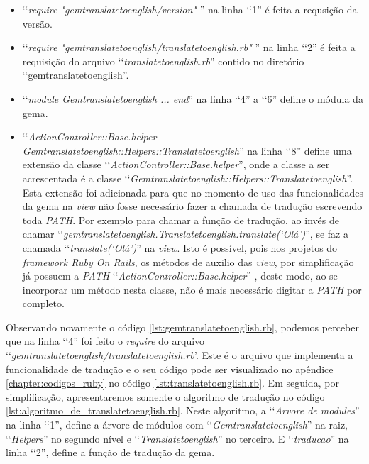 \begin{itemize}

 \item ‘‘\emph{require "gemtranslatetoenglish/version"} '' na linha ‘‘1'' é feita a requsição da versão.

 \item ‘‘\emph{require "gemtranslatetoenglish/translatetoenglish.rb"} '' na linha ‘‘2'' é feita a requisição
 do arquivo ‘‘\emph{translatetoenglish.rb}'' contido no diretório ‘‘gemtranslatetoenglish''.

 \item ‘‘\emph{module Gemtranslatetoenglish ... end}'' na linha ‘‘4'' a ‘‘6'' define o módula da gema.

 \item ‘‘\emph{ActionController::Base.helper Gemtranslatetoenglish::Helpers::Translatetoenglish}'' na linha
 ‘‘8'' define uma extensão da classe ‘‘\emph{ActionController::Base.helper}'', onde a classe a ser
 acrescentada é a classe ‘‘\emph{Gemtranslatetoenglish::Helpers::Translatetoenglish}''. Esta extensão foi
 adicionada para que no momento de uso das funcionalidades da gema na \emph{view} não fosse necessário
 fazer a chamada de tradução  escrevendo toda \emph{PATH}. Por exemplo para chamar a função de tradução,
 ao invés de chamar ‘‘\emph{gemtranslatetoenglish.Translatetoenglish.translate(‘Olá’)}'', se faz a chamada
 ‘‘\emph{translate(‘Olá’)}'' na \emph{view}. Isto é possível, pois nos projetos do
 \emph{framework Ruby On Rails}, os métodos de auxilio das \emph{view}, por simplificação já possuem a
 \emph{PATH} ‘‘\emph{ActionController::Base.helper}'' , deste modo, ao se incorporar um método nesta classe,
 não é mais necessário digitar a \emph{PATH} por completo.

\end{itemize}

Observando novamente o código \ref{lst:gemtranslatetoenglish.rb}, podemos perceber que na linha ‘‘4''
foi feito o \emph{require} do arquivo ‘‘\emph{gemtranslatetoenglish/translatetoenglish.rb}'. Este é o
arquivo que implementa a funcionalidade de tradução e o seu código pode ser visualizado no apêndice
\ref{chapter:codigos_ruby} no código \ref{lst:translatetoenglish.rb}. Em seguida, por simplificação,
apresentaremos somente o algoritmo de tradução no código \ref{lst:algoritmo_de_translatetoenglish.rb}.
Neste algoritmo, a ‘‘\emph{Arvore de modules}'' na linha ‘‘1'', define a árvore de módulos com
‘‘\emph{Gemtranslatetoenglish}'' na raiz, ‘‘\emph{Helpers}'' no segundo nível e ‘‘\emph{Translatetoenglish}''
no terceiro. E ‘‘\emph{traducao}'' na linha ‘‘2'', define a função de tradução da gema.

